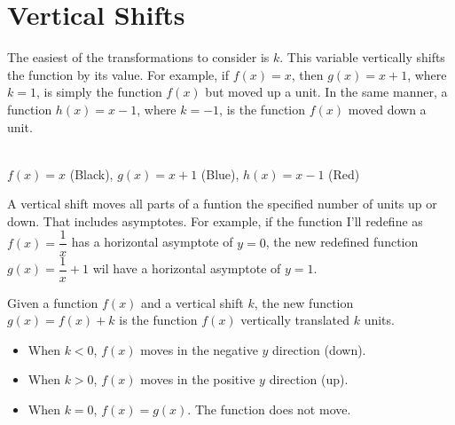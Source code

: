 \section{Vertical Shifts}
The easiest of the transformations to consider is $k$. This variable vertically shifts the function by its value. For example, if $f(x) = x$, then $g(x) = x + 1$, where $k = 1$, is simply the function $f(x)$ but moved up a unit. In the same manner, a function $h(x) = x - 1$, where $k = -1$, is the function $f(x)$ moved down a unit.

\begin{center}
    \\
    $f(x) = x$ (Black), 
    $g(x) = x + 1$ (Blue), 
    $h(x) = x - 1$ (Red)
\end{center}
A vertical shift moves all parts of a funtion the specified number of units up or down. That includes asymptotes. For example, if the function I'll redefine as $f(x) = \dfrac{1}{x}$ has a horizontal asymptote of $y = 0$, the new redefined function $g(x) = \dfrac{1}{x} + 1$ wil have a horizontal asymptote of $y = 1$.
\begin{definition}
Given a function $f(x)$ and a vertical shift $k$, the new function $g(x) = f(x) + k$ is the function $f(x)$ vertically translated $k$ units.
\begin{itemize}
    \item When $k < 0$, $f(x)$ moves in the negative $y$ direction (down).
    \item When $k > 0$, $f(x)$ moves in the positive $y$ direction (up).
    \item When $k = 0$, $f(x) = g(x)$. The function does not move.
\end{itemize} 
\end{definition}